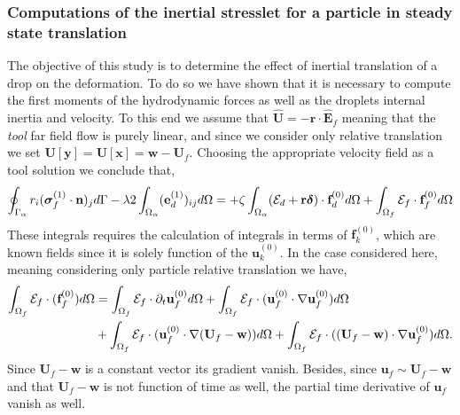 \subsubsection{Computations of the inertial stresslet for a particle in steady state translation}

The objective of this study is to determine the effect of inertial translation of a drop on the deformation.
To do so we have shown that it is necessary to compute the first moments of the hydrodynamic forces as well as the droplets internal inertia and velocity. 
To this end we assume that $\hat{\textbf{U}} = - \textbf{r} \cdot \hat{\textbf{E}}_f$ meaning  that the \textit{tool} far field flow is purely linear, and since we consider only relative translation we set $\textbf{U}[\textbf{y}] = \textbf{U}[\textbf{x}] = \textbf{w} - \textbf{U}_f$. 
Choosing the appropriate velocity field as a tool solution we conclude that, 
\begin{equation*}
    \oint_{\Gamma_{\alpha}} r_i (\bm\sigma_f^{(1)} \cdot \textbf{n})_j d\Gamma
    -\lambda 2 \int_{\Omega_{\alpha}}  (\textbf{e}_d^{(1)})_{ij}   d\Omega
    = 
    + \zeta\int_{\Omega_{\alpha}} (\mathcal{E}_d + \textbf{r}\bm\delta) \cdot \textbf{f}_d^{(0)} d\Omega
    + \int_{\Omega_f} \mathcal{E}_f \cdot  \textbf{f}^{(0)}_f d\Omega
\end{equation*}
These integrals requires the calculation of integrals in terms of $\textbf{f}^{(0)}_k$, which are known fields since it is solely function of the $\textbf{u}^{(0)}_k$. 
In the case considered here, meaning considering only particle relative translation we have, 
\begin{align*}
    \int_{\Omega_f} \mathcal{E}_f \cdot  (\textbf{f}^{(0)}_f) d\Omega
    &=
    \int_{\Omega_f} \mathcal{E}_f \cdot  \partial_t \textbf{u}_f^{(0)} d\Omega
    + \int_{\Omega_f} \mathcal{E}_f \cdot (\textbf{u}_f^{(0)}\cdot \mathbf{\nabla} \textbf{u}_f^{(0)}) d\Omega\\
    &+ \int_{\Omega_f} \mathcal{E}_f \cdot (\textbf{u}_f^{(0)}\cdot \mathbf{\nabla} (\textbf{U}_f - \textbf{w})) d\Omega
    + \int_{\Omega_f} \mathcal{E}_f \cdot ((\textbf{U}_f - \textbf{w})\cdot \mathbf{\nabla} \textbf{u}_f^{(0)}) d\Omega.
\end{align*}
Since $\textbf{U}_f - \textbf{w}$ is a constant vector its gradient vanish. 
Besides, since $ \textbf{u}_f \sim \textbf{U}_f - \textbf{w}$  and that $\textbf{U}_f - \textbf{w}$ is not function of time as well, the partial time derivative of $\textbf{u}_f$ vanish as well. 

